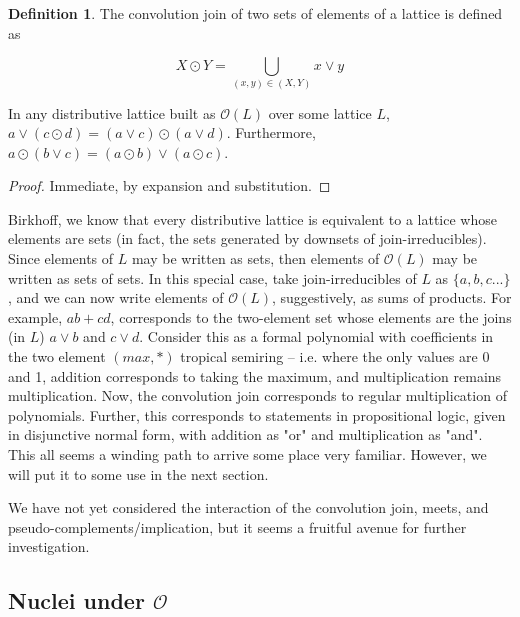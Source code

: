 \documentclass[hoptionsi,review,format=sigplan]{acmart}
\theoremstyle{definition}
\newtheorem{definition}{Definition}[section]
\newcommand{\Oc}{\mathcal{O}}
\begin{document}
\begin{definition}
The convolution join of two sets of elements of a lattice is defined as

\begin{equation}
X \odot Y = \bigcup_{(x,y) \in (X,Y)} x \vee y
\end{equation}

\end{definition}

\begin{lemma}
In any distributive lattice built as  \(\Oc(L)\) over some lattice \(L\), \(a \vee (c \odot d) = (a \vee c) \odot (a \vee d)\). Furthermore, \(a \odot (b \vee c) = (a \odot b) \vee (a \odot c)\).
\end{lemma}
\begin{proof}
Immediate, by expansion and substitution.
\end{proof}

Birkhoff, we know that every distributive lattice is equivalent to a lattice whose elements are sets (in fact, the sets generated by downsets of join-irreducibles). Since elements of \(L\) may be written as sets, then elements of \(\Oc(L)\) may be written as sets of sets. In this special case, take join-irreducibles of \(L\) as \(\{a, b, c...\}\), and we can now write elements of \(\Oc(L)\), suggestively, as sums of products. For example, \(ab + cd\), corresponds to the two-element set whose elements are the joins (in \(L\)) \(a \vee b\) and \(c \vee d\). Consider this as a formal polynomial with coefficients in the two element \((max,*)\) tropical semiring -- i.e. where the only values are 0 and 1, addition corresponds to taking the maximum, and multiplication remains multiplication. Now, the convolution join corresponds to regular multiplication of polynomials. Further, this corresponds to statements in propositional logic, given in disjunctive normal form, with addition as "or" and multiplication as "and". This all seems a winding path to arrive some place very familiar. However, we will put it to some use in the next section.

We have not yet considered the interaction of the convolution join, meets, and pseudo-complements/implication, but it seems a fruitful avenue for further investigation.

\subsection{Nuclei under \(\Oc\)}
\end{document}

